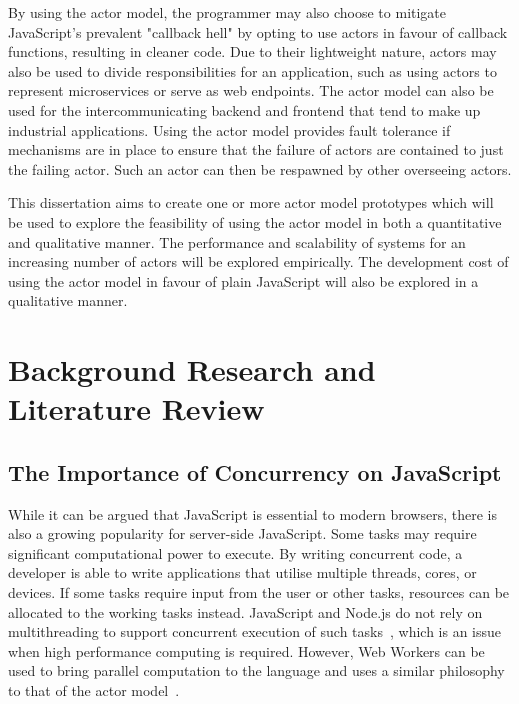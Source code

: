 \documentclass{report}
\begin{document}
By using the actor model, the programmer may also choose to mitigate JavaScript's prevalent "callback hell" by opting to use actors in favour of callback functions, resulting in cleaner code. Due to their lightweight nature, actors may also be used to divide responsibilities for an application, such as using actors to represent microservices or serve as web endpoints\cite{hewitt2010actor}.  The actor model can also be used for the intercommunicating backend and frontend that tend to make up industrial applications. Using the actor model provides fault tolerance if mechanisms are in place to ensure that the failure of actors are contained to just the failing actor. Such an actor can then be respawned by other overseeing actors.

This dissertation aims to create one or more actor model prototypes which will be used to explore the feasibility of using the actor model in both a quantitative and qualitative manner. The performance and scalability of systems for an increasing number of actors will be explored empirically. The development cost of using the actor model in favour of plain JavaScript will also be explored in a qualitative manner.
\section{Background Research and Literature Review}
\subsection{The Importance of Concurrency on JavaScript}
While it can be argued that JavaScript is essential to modern browsers, there is also a growing popularity for server-side JavaScript. Some tasks may require significant computational power to execute. By writing concurrent code, a developer is able to write applications that utilise multiple threads, cores, or devices. If some tasks require input from the user or other tasks, resources can be allocated to the working tasks instead. JavaScript and Node.js do not rely on multithreading to support concurrent execution of such tasks~\cite{highperformance}, which is an issue when high performance computing is required. However, Web Workers can be used to bring parallel computation to the language and uses a similar philosophy to that of the actor model~\cite{concurrencyjs}.
\end{document}

